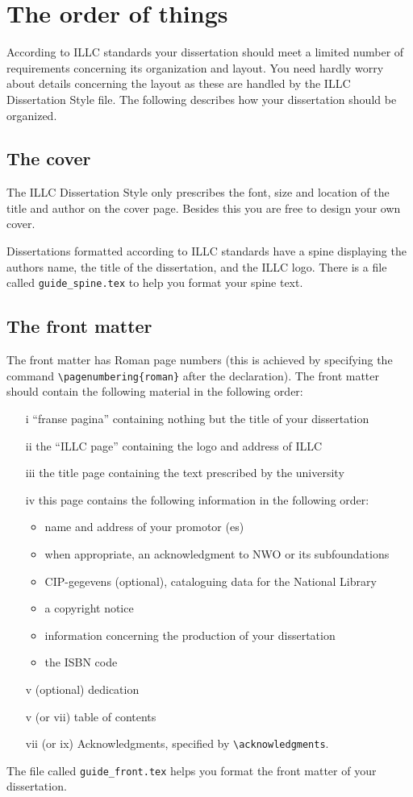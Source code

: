 \chapter{The order of things}
According to ILLC standards your dissertation should meet a limited number
of requirements concerning its organization and layout. You need hardly 
worry about details concerning the layout as these are handled by the
ILLC Dissertation Style file. The following describes how your dissertation
should be organized.

\section{The cover}
The ILLC Dissertation Style only prescribes the font, size and location 
of the title and author on the cover page. Besides this you are free to 
design your own cover.

Dissertations formatted according to ILLC standards have a spine displaying
the authors name, the title of the dissertation, and the ILLC logo.
There is a file called {\tt guide\_spine.tex} to help you format 
your spine text.


\section{The front matter}
The front matter has Roman page numbers (this is achieved by
specifying the command \verb|\pagenumbering{roman}| after the 
\verb|| declaration). The front matter should contain 
the following material in the following order:
\begin{enumerate}
\item[i]
``franse pagina'' containing nothing but the title of your dissertation
\item[ii]
the ``ILLC page'' containing the logo and address of ILLC
\item[iii]
the title page containing the text prescribed by the university
\item[iv]
this page contains the following information in the following order:
	\begin{itemize}
	\item
	name and address of your promotor (es)
	\item
	when appropriate, an acknowledgment to NWO or its subfoundations
	\item
	CIP-gegevens (optional), cataloguing data for the National Library
	\item
	a copyright notice
	\item
	information concerning the production of your dissertation
	\item
	the ISBN code
	\end{itemize}
\item[v] (optional)
dedication
\item[v] (or vii)
table of contents
\item[vii] (or ix)
Acknowledgments, specified by \verb|\acknowledgments|.
\end{enumerate}
The file called  \verb|guide_front.tex| helps you format
the front matter of your dissertation.


